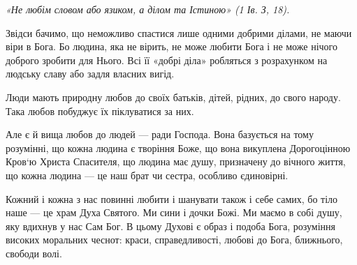 \documentclass[main.tex]{subfiles}
\begin{document}
\begin{FlushRight}
   \emph{«Не любім словом або язиком, а ділом та Істиною» (1 Ів. З, 18).} 
\end{FlushRight}

Звідси бачимо, що неможливо спастися лише одними добрими ділами, не маючи віри в Бога. Бо людина, яка не вірить, не може любити Бога і не може нічого доброго зробити для Нього. Всі її «добрі діла» робляться з розрахунком на людську славу або задля власних вигід.

Люди мають природну любов до своїх батьків, дітей, рідних, до свого народу. Така любов побуджує їх піклуватися за них.

Але є й вища любов до людей — ради Господа. Вона базується на тому розумінні, що кожна людина є творіння Боже, що вона викуплена Дорогоцінною Кров`ю Христа Спасителя, що людина має душу, призначену до вічного життя, що кожна людина — це наш брат чи сестра, особливо єдиновірні.

Кожний і кожна з нас повинні любити і шанувати також і себе самих, бо тіло наше — це храм Духа Святого. Ми сини і дочки Божі. Ми маємо в собі душу, яку вдихнув у нас Сам Бог. В цьому Духові є образ і подоба Бога, розуміння високих моральних чеснот: краси, справедливості, любові до Бога, ближнього, свободи волі.
\end{document}
